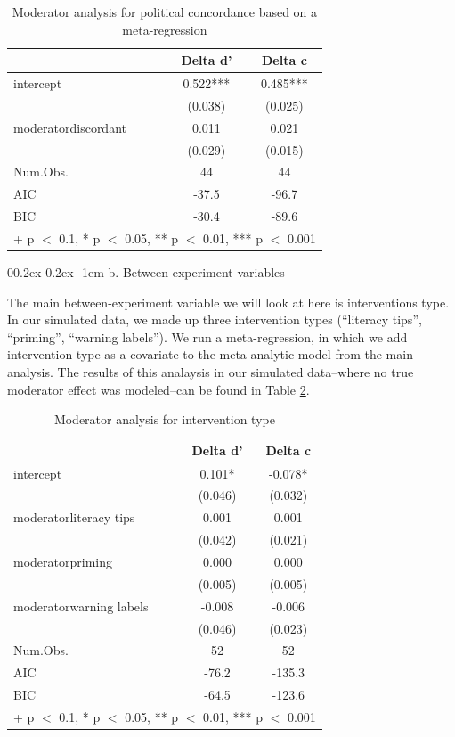 \documentclass[
  man,mask,floatsintext]{apa6}
\makeatletter
\let\oldparagraph\paragraph
\renewcommand{\paragraph}{
    \@ifstar
      \xxxParagraphStar
      \xxxParagraphNoStar
  }
\newcommand{\xxxParagraphStar}[1]{\oldparagraph*{#1}\mbox{}}
\newcommand{\xxxParagraphNoStar}[1]{\oldparagraph{#1}\mbox{}}
\renewcommand{\paragraph}{\@startsection{paragraph}{4}{\parindent}%
  {0\baselineskip \@plus 0.2ex \@minus 0.2ex}%
  {-1em}%
  {\normalfont\normalsize\bfseries\itshape\typesectitle}}
\makeatother
\begin{document}
\begin{table}
\centering
\caption{\label{tab:concordance-separate-baseline-model}Moderator analysis for political concordance based on a meta-regression}
\centering
\begin{tabular}[t]{lcc}
\toprule
  & Delta d' & Delta c\\
\midrule
intercept & 0.522*** & 0.485***\\
 & (0.038) & (0.025)\\
moderatordiscordant & 0.011 & 0.021\\
 & (0.029) & (0.015)\\
\midrule
Num.Obs. & 44 & 44\\
AIC & -37.5 & -96.7\\
BIC & -30.4 & -89.6\\
\bottomrule
\multicolumn{3}{l}{\rule{0pt}{1em}+ p $<$ 0.1, * p $<$ 0.05, ** p $<$ 0.01, *** p $<$ 0.001}\\
\end{tabular}
\end{table}

\paragraph{b. Between-experiment variables}\label{b.-between-experiment-variables}

The main between-experiment variable we will look at here is interventions type. In our simulated data, we made up three intervention types (``literacy tips'', ``priming'', ``warning labels''). We run a meta-regression, in which we add intervention type as a covariate to the meta-analytic model from the main analysis. The results of this analaysis in our simulated data--where no true moderator effect was modeled--can be found in Table \ref{tab:intervention-type-moderator}.

\begin{table}
\centering
\caption{\label{tab:intervention-type-moderator}Moderator analysis for intervention type}
\centering
\begin{tabular}[t]{lcc}
\toprule
  & Delta d' & Delta c\\
\midrule
intercept & 0.101* & -0.078*\\
 & (0.046) & (0.032)\\
moderatorliteracy tips & 0.001 & 0.001\\
 & (0.042) & (0.021)\\
moderatorpriming & 0.000 & 0.000\\
 & (0.005) & (0.005)\\
moderatorwarning labels & -0.008 & -0.006\\
 & (0.046) & (0.023)\\
\midrule
Num.Obs. & 52 & 52\\
AIC & -76.2 & -135.3\\
BIC & -64.5 & -123.6\\
\bottomrule
\multicolumn{3}{l}{\rule{0pt}{1em}+ p $<$ 0.1, * p $<$ 0.05, ** p $<$ 0.01, *** p $<$ 0.001}\\
\end{tabular}
\end{table}
\end{document}
